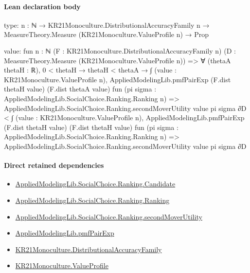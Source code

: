 \documentclass[10pt]{article}
\begin{document}
\paragraph{Lean declaration body}
\begin{ReviewVerbatim}
type:
{n : ℕ} → KR21Monoculture.DistributionalAccuracyFamily n → MeasureTheory.Measure (KR21Monoculture.ValueProfile n) → Prop

value:
fun {n : ℕ} (F : KR21Monoculture.DistributionalAccuracyFamily n)
    (D : MeasureTheory.Measure (KR21Monoculture.ValueProfile n)) =>
  ∀ (thetaA thetaH : ℝ),
    0 < thetaH →
      thetaH < thetaA →
        ∫ (value : KR21Monoculture.ValueProfile n),
            AppliedModelingLib.pmfPairExp (F.dist thetaH value) (F.dist thetaA value)
              fun (pi sigma : AppliedModelingLib.SocialChoice.Ranking.Ranking n) =>
              AppliedModelingLib.SocialChoice.Ranking.secondMoverUtility value pi sigma ∂D <
          ∫ (value : KR21Monoculture.ValueProfile n),
            AppliedModelingLib.pmfPairExp (F.dist thetaH value) (F.dist thetaH value)
              fun (pi sigma : AppliedModelingLib.SocialChoice.Ranking.Ranking n) =>
              AppliedModelingLib.SocialChoice.Ranking.secondMoverUtility value pi sigma ∂D
\end{ReviewVerbatim}

\paragraph{Direct retained dependencies}
\begin{itemize}\raggedright
\item \hyperlink{library-prerequisite-8c0e6c25845ae78a}{Applied\allowbreak{}Modeling\allowbreak{}Lib.\allowbreak{}Social\allowbreak{}Choice.\allowbreak{}Ranking.\allowbreak{}Candidate}
\item \hyperlink{library-prerequisite-5cde54446d1ae021}{Applied\allowbreak{}Modeling\allowbreak{}Lib.\allowbreak{}Social\allowbreak{}Choice.\allowbreak{}Ranking.\allowbreak{}Ranking}
\item \hyperlink{library-prerequisite-21bd2a45ab961ae4}{Applied\allowbreak{}Modeling\allowbreak{}Lib.\allowbreak{}Social\allowbreak{}Choice.\allowbreak{}Ranking.\allowbreak{}second\allowbreak{}Mover\allowbreak{}Utility}
\item \hyperlink{governing-declaration-09677001d465ec9d}{Applied\allowbreak{}Modeling\allowbreak{}Lib.\allowbreak{}pmf\allowbreak{}Pair\allowbreak{}Exp}
\item \hyperlink{paper-prerequisite-ee564fa2921e1add}{KR21\allowbreak{}Monoculture.\allowbreak{}Distributional\allowbreak{}Accuracy\allowbreak{}Family}
\item \hyperlink{paper-prerequisite-c0e41e9b0e843969}{KR21\allowbreak{}Monoculture.\allowbreak{}Value\allowbreak{}Profile}
\end{itemize}
\hypertarget{governing-declaration-c73f18d8ae75d762}{}
\end{document}
